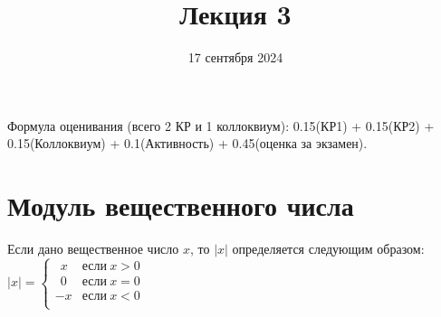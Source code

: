 \documentclass{article}
\title{Лекция 3}
\author{}
\date{17 сентября 2024}
\begin{document}
\maketitle
\noindent
Формула оценивания (всего 2 КР и 1 коллоквиум): 0.15(КР1) + 0.15(КР2) + 0.15(Коллоквиум) + 0.1(Активность) + 0.45(оценка за экзамен).
\section{Модуль вещественного числа}
    \begin{definition}
        Если дано вещественное число \(x\), то \(|x|\) определяется следующим образом: 
        \(|x| = 
        \begin{cases}
            \ \ x & \text{если}\  x > 0\\
            \ \ 0 & \text{если}\  x = 0\\
            -x & \text{если}\ x < 0\\
        \end{cases}
        \)
    \end{definition}
\end{document}
